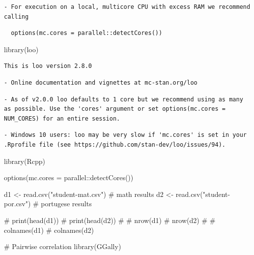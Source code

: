 \documentclass[
  10pt,
]{article}
\newenvironment{Shaded}{\begin{snugshade}}{\end{snugshade}}
\newcommand{\AttributeTok}[1]{\textcolor[rgb]{0.40,0.45,0.13}{#1}}
\newcommand{\CommentTok}[1]{\textcolor[rgb]{0.37,0.37,0.37}{#1}}
\newcommand{\FunctionTok}[1]{\textcolor[rgb]{0.28,0.35,0.67}{#1}}
\newcommand{\NormalTok}[1]{\textcolor[rgb]{0.00,0.23,0.31}{#1}}
\newcommand{\OtherTok}[1]{\textcolor[rgb]{0.00,0.23,0.31}{#1}}
\newcommand{\SpecialCharTok}[1]{\textcolor[rgb]{0.37,0.37,0.37}{#1}}
\newcommand{\StringTok}[1]{\textcolor[rgb]{0.13,0.47,0.30}{#1}}
\begin{document}
\begin{verbatim}
- For execution on a local, multicore CPU with excess RAM we recommend calling
\end{verbatim}

\begin{verbatim}
  options(mc.cores = parallel::detectCores())
\end{verbatim}

\begin{Shaded}
\begin{Highlighting}[]
\FunctionTok{library}\NormalTok{(loo)}
\end{Highlighting}
\end{Shaded}

\begin{verbatim}
This is loo version 2.8.0
\end{verbatim}

\begin{verbatim}
- Online documentation and vignettes at mc-stan.org/loo
\end{verbatim}

\begin{verbatim}
- As of v2.0.0 loo defaults to 1 core but we recommend using as many as possible. Use the 'cores' argument or set options(mc.cores = NUM_CORES) for an entire session. 
\end{verbatim}

\begin{verbatim}
- Windows 10 users: loo may be very slow if 'mc.cores' is set in your .Rprofile file (see https://github.com/stan-dev/loo/issues/94).
\end{verbatim}

\begin{Shaded}
\begin{Highlighting}[]
\FunctionTok{library}\NormalTok{(Rcpp)}

\FunctionTok{options}\NormalTok{(}\AttributeTok{mc.cores =}\NormalTok{ parallel}\SpecialCharTok{::}\FunctionTok{detectCores}\NormalTok{()) }

\NormalTok{d1 }\OtherTok{\textless{}{-}} \FunctionTok{read.csv}\NormalTok{(}\StringTok{"student{-}mat.csv"}\NormalTok{) }\CommentTok{\# math results  }
\NormalTok{d2 }\OtherTok{\textless{}{-}} \FunctionTok{read.csv}\NormalTok{(}\StringTok{"student{-}por.csv"}\NormalTok{) }\CommentTok{\# portugese results }

\CommentTok{\# print(head(d1))}
\CommentTok{\# print(head(d2))}
\CommentTok{\# }
\CommentTok{\# nrow(d1)}
\CommentTok{\# nrow(d2)}
\CommentTok{\# }
\CommentTok{\# colnames(d1)}
\CommentTok{\# colnames(d2)}

\CommentTok{\# Pairwise correlation}
\FunctionTok{library}\NormalTok{(GGally)}
\end{Highlighting}
\end{Shaded}
\end{document}

